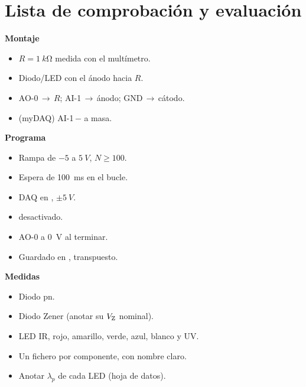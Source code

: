 \documentclass[11pt,a4paper]{article}
\begin{document}
\section{Lista de comprobación y evaluación}
\label{sec:checklist}

\begin{tcolorbox}[enhanced,sharp corners,boxrule=0pt,frame hidden,
  borderline west={2.2pt}{0pt}{navy},lineas=grisclaro,
  interior style={left color=azulclaro,right color=white},left=10pt,right=8pt]
\small{}
\begin{minipage}[t]{0.48\linewidth}
{\color{navy}\bfseries Montaje}
\begin{itemize}
  \item $R=\SI{1}{k\ohm}$ medida con el multímetro.
  \item Diodo/LED con el ánodo hacia $R$.
  \item AO-0\,$\to$\,$R$; AI-1\,$\to$\,ánodo; GND\,$\to$\,cátodo.
  \item (myDAQ) AI-1\,$-$ a masa.
\end{itemize}
{\color{navy}\bfseries Programa}
\begin{itemize}
  \item Rampa de $-5$ a $\SI{5}{V}$, $N\ge100$.
  \item Espera de \SI{100}{ms} en el bucle.
  \item DAQ en , $\pm\SI{5}{V}$.
  \item {} desactivado.
  \item AO-0 a \SI{0}{V} al terminar.
  \item Guardado en , transpuesto.
\end{itemize}
\end{minipage}\hfill
\begin{minipage}[t]{0.48\linewidth}
{\color{navy}\bfseries Medidas}
\begin{itemize}
  \item Diodo pn.
  \item Diodo Zener (anotar su $V_{\mathrm Z}$ nominal).
  \item LED IR, rojo, amarillo, verde, azul, blanco y UV.
  \item Un fichero por componente, con nombre claro.
  \item Anotar $\lambda_p$ de cada LED (hoja de datos).

\end{itemize}
\end{minipage}
\end{tcolorbox}
\end{document}
